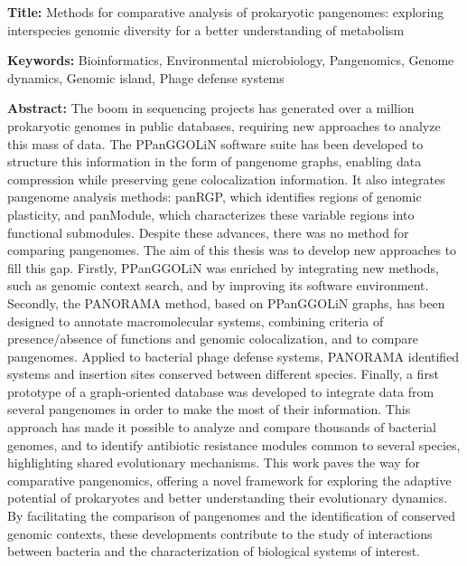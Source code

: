 \vspace{-12pt}

\begin{mdframed}[linecolor=Prune,linewidth=1]

\textbf{Title:} Methods for comparative analysis of prokaryotic pangenomes: exploring interspecies genomic diversity for a better understanding of metabolism

\noindent \textbf{Keywords:} Bioinformatics, Environmental microbiology, Pangenomics, Genome dynamics, Genomic island, Phage defense systems
\vspace{-12pt}
\begin{multicols}{2}
\noindent \textbf{Abstract:} The boom in sequencing projects has generated over a million prokaryotic genomes in public databases, requiring new approaches to analyze this mass of data. The PPanGGOLiN software suite has been developed to structure this information in the form of pangenome graphs, enabling data compression while preserving gene colocalization information. It also integrates pangenome analysis methods: panRGP, which identifies regions of genomic plasticity, and panModule, which characterizes these variable regions into functional submodules. Despite these advances, there was no method for comparing pangenomes. The aim of this thesis was to develop new approaches to fill this gap. Firstly, PPanGGOLiN was enriched by integrating new methods, such as genomic context search, and by improving its software environment. Secondly, the PANORAMA method, based on PPanGGOLiN graphs, has been designed to annotate macromolecular systems, combining criteria of presence/absence of functions and genomic colocalization, and to compare pangenomes. Applied to bacterial phage defense systems, PANORAMA identified systems and insertion sites conserved between different species. Finally, a first prototype of a graph-oriented database was developed to integrate data from several pangenomes in order to make the most of their information. This approach has made it possible to analyze and compare thousands of bacterial genomes, and to identify antibiotic resistance modules common to several species, highlighting shared evolutionary mechanisms. This work paves the way for comparative pangenomics, offering a novel framework for exploring the adaptive potential of prokaryotes and better understanding their evolutionary dynamics. By facilitating the comparison of pangenomes and the identification of conserved genomic contexts, these developments contribute to the study of interactions between bacteria and the characterization of biological systems of interest.
\end{multicols}
\end{mdframed}